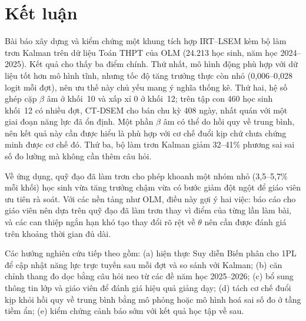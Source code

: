 
\section{Kết luận}
\label{sec:conclusion}

Bài báo xây dựng và kiểm chứng một khung tích hợp IRT--LSEM kèm bộ làm trơn Kalman trên dữ liệu Toán THPT của OLM (24{.}213 học sinh, năm học 2024--2025). Kết quả cho thấy ba điểm chính. Thứ nhất, mô hình động phù hợp với dữ liệu tốt hơn mô hình tĩnh, nhưng tốc độ tăng trưởng thực còn nhỏ (0{,}006--0{,}028 logit mỗi đợt), nên ưu thế này chủ yếu mang ý nghĩa thống kê. Thứ hai, hệ số ghép cặp \(\beta\) âm ở khối~10 và xấp xỉ 0 ở khối~12; trên tập con 460 học sinh khối~12 có nhiều đợt, CT-DSEM cho bán chu kỳ 408 ngày, nhất quán với một giai đoạn năng lực đã ổn định. Một phần \(\beta\) âm có thể do hồi quy về trung bình, nên kết quả này cần được hiểu là phù hợp với cơ chế đuổi kịp chứ chưa chứng minh được cơ chế đó. Thứ ba, bộ làm trơn Kalman giảm 32--41\% phương sai sai số đo lường mà không cần thêm câu hỏi.

Về ứng dụng, quỹ đạo đã làm trơn cho phép khoanh một nhóm nhỏ (3{,}5--5{,}7\% mỗi khối) học sinh vừa tăng trưởng chậm vừa có bước giảm đột ngột để giáo viên ưu tiên rà soát. Với các nền tảng như OLM, điều này gợi ý hai việc: báo cáo cho giáo viên nên dựa trên quỹ đạo đã làm trơn thay vì điểm của từng lần làm bài, và các can thiệp ngắn hạn khó tạo thay đổi rõ rệt về \(\theta\) nên cần được đánh giá trên khoảng thời gian đủ dài.

Các hướng nghiên cứu tiếp theo gồm: (a) hiện thực Suy diễn Biến phân cho 1PL để cập nhật năng lực trực tuyến sau mỗi đợt và so sánh với Kalman; (b) căn chỉnh thang đo dọc bằng câu hỏi neo từ các đề năm học 2025--2026; (c) bổ sung thông tin lớp và giáo viên để đánh giá hiệu quả giảng dạy; (d) tách cơ chế đuổi kịp khỏi hồi quy về trung bình bằng mô phỏng hoặc mô hình hoá sai số đo ở tầng tiềm ẩn; (e) kiểm chứng cảnh báo sớm với kết quả học tập về sau.
